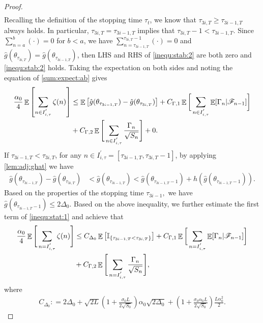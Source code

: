 \documentclass[standalone]{article}
\newcommand{\I}{\mathbb{I}}
\DeclareMathOperator{\Expect}{\mathbb{E}}
\begin{document}
\begin{proof}
\begin{align}
\end{align} 
Recalling the definition of the stopping time $\tau_t$, we know that \(\tau_{3i,T} \geq \tau_{3i-1,T}\) always holds. In particular, \(\tau_{3i,T} = \tau_{3i-1,T}\) implies that \(\tau_{3i,T}-1 < \tau_{3i-1,T}\). Since $\sum_{n=a}^b(\cdot) = 0$ for $b  <  a$, we have  $\sum_{n=\tau_{3i-1,T}}^{\tau_{3i,T}-1}(\cdot) = 0 $ and $\hat{g}(\theta_{\tau_{3i,T}}) = \hat{g}(\theta_{\tau_{3i-1,T}})$, then LHS and RHS of \cref{inequ:stab:2} are both zero and \cref{inequ:stab:2} holds. Taking the expectation on both sides and noting the equation of \cref{sum:expect:ab} gives
\begin{align}\label{inequ:stat:1}
\frac{\alpha_{0}}{4}\Expect\left[\sum_{n \in I_{i,\tau}^{'}}\zeta(n)\right]&\le \Expect\big[\hat{g}(\theta_{\tau_{3i-1,T}})-\hat{g}(\theta_{\tau_{3i,T}})\big]+C_{\Gamma,1}\Expect\bigg[\sum_{n \in I_{i,\tau}^{'}} \Expect[\Gamma_n|\mathscr{F}_{n-1}] \bigg]\notag\\&+C_{\Gamma,2}\Expect\Bigg[\sum_{n \in I_{i,\tau}^{'}}\frac{\Gamma_{n}}{\sqrt{S_{n}}}\Bigg]+0.
\end{align}
If \(\tau_{3i-1, T} <  \tau_{3i, T}\),  for any $n \in I_{i,\tau}^{'} = [\tau_{3i-1,T}, \tau_{3i,T}-1]$, by applying \cref{lem:adj:ghat} we have
\begin{align*}
\hat{g}(\theta_{\tau_{3i-1, T}}) - \hat{g}(\theta_{\tau_{3i,T}})&<\hat{g}(\theta_{\tau_{3i-1,T}}) <  \hat{g}(\theta_{\tau_{3i-1,T}-1})+h(\hat{g}(\theta_{\tau_{3i-1,T}-1})).
\end{align*}
Based on the properties of the stopping time \(\tau_{3i-1},\) we have $\hat{g}(\theta_{\tau_{3i-1,T}-1}) \leq 2\Delta_{0}.$ Based on the above inequality, we further estimate the first term of  \cref{inequ:stat:1} and achieve that
\begin{align}\label{wxm_90}
\frac{\alpha_{0}}{4}\Expect\Bigg[\sum_{n=I_{i,\tau}^{'}}\zeta(n)\Bigg]\notag&\le C_{\Delta_{0}}\Expect\big[\I_{\{\tau_{3i-1,T}<\tau_{3i,T} \}}\big]+C_{\Gamma,1}\Expect\bigg[\sum_{n=I_{i,\tau}^{'}} \Expect[\Gamma_n|\mathscr{F}_{n-1}] \bigg] \\&+C_{\Gamma,2}\Expect\Bigg[\sum_{n=I_{i,\tau}^{'}}\frac{\Gamma_{n}}{\sqrt{S_{n}}}\Bigg]  ,
\end{align}
where
\begin{align}\label{inequ:C:Delta0}
C_{\Delta_{0}}: =2\Delta_{0}+ \sqrt{2 L}\left(1 + \frac{\sigma_0 L}{2\sqrt{S_0}}\right)\alpha_0\sqrt{2\Delta_0} + \left(1  + \frac{\sigma_0\alpha_0 L}{2\sqrt{S_0}}\right)\frac{ L\alpha_0^2}{2}.
\end{align}

\end{proof}
\end{document}

